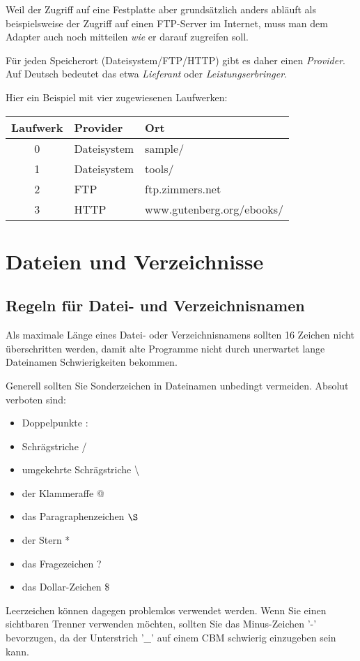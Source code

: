 \documentclass[10pt,a4paper]{scrartcl}		%
\begin{document}
Weil der Zugriff auf eine Festplatte aber grundsätzlich anders abläuft
als beispielsweise der Zugriff auf einen FTP-Server im Internet, 
muss man dem Adapter auch noch mitteilen \textit{wie} er darauf
zugreifen soll.

Für jeden Speicherort (Dateisystem/FTP/HTTP) gibt es daher einen 
\textit{Provider}. Auf Deutsch bedeutet das etwa \textit{Lieferant}
oder \textit{Leistungserbringer}. 

Hier ein Beispiel mit vier zugewiesenen Laufwerken:

\begin{tabular}[c]{c l l}
\toprule
Laufwerk & Provider & Ort \\
\midrule
0 & Dateisystem & sample/ \\
1 & Dateisystem & tools/ \\
2 & FTP & ftp.zimmers.net \\
3 & HTTP & www.gutenberg.org/ebooks/ \\
\bottomrule
\end{tabular}

\section{Dateien und Verzeichnisse}
\subsection{Regeln für Datei- und Verzeichnisnamen}
Als maximale Länge eines Datei- oder Verzeichnisnamens sollten
16 Zeichen nicht überschritten werden, damit alte Programme nicht
durch unerwartet lange Dateinamen Schwierigkeiten bekommen.

Generell sollten Sie Sonderzeichen in Dateinamen unbedingt 
vermeiden. Absolut verboten sind:
\begin{itemize}
\item Doppelpunkte :
\item Schrägstriche /
\item umgekehrte Schrägstriche \textbackslash
\item der Klammeraffe @
\item das Paragraphenzeichen $\S$
\item der Stern *
\item das Fragezeichen ? 
\item das Dollar-Zeichen \$
\end{itemize}
Leerzeichen können dagegen problemlos verwendet werden.
Wenn Sie einen sichtbaren Trenner verwenden möchten, sollten
Sie das Minus-Zeichen '-' bevorzugen, da der Unterstrich '\_' 
auf einem CBM schwierig einzugeben sein kann.
\end{document}
